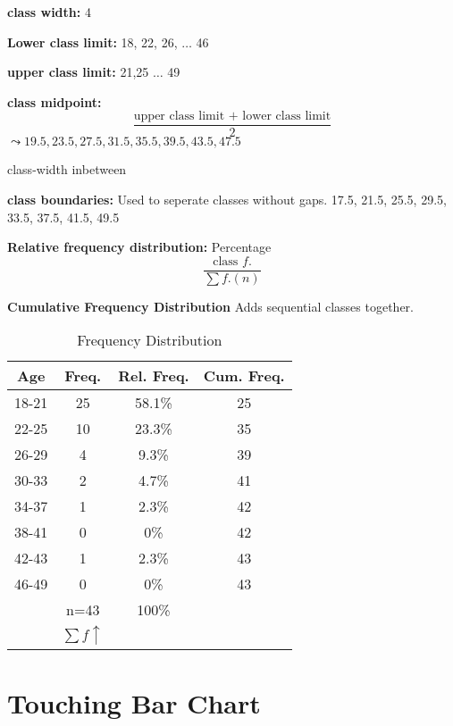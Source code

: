 \documentclass{book}
\begin{document}
\begin{multicols}{2}


    \textbf{class width:} 4

    \textbf{Lower class limit:} 18, 22, 26, $\ldots$ 46

    \textbf{upper class limit:} 21,25 $\ldots$ 49

    \textbf{class midpoint:}
    \[ \frac{\text{upper class limit + lower class limit}}{2}\] 
    $\leadsto 19.5, 23.5, 27.5, 31.5, 35.5, 39.5, 43.5, 47.5$

    class-width inbetween

    \textbf{class boundaries:}
    Used to seperate classes without gaps.
    17.5, 21.5, 25.5, 29.5, 33.5, 37.5, 41.5, 49.5

    \textbf{Relative frequency distribution:} Percentage \[\frac{\text{class } f.}{\sum f. (n)}\]

    \textbf{Cumulative Frequency Distribution}
    Adds sequential classes together.
\end{multicols}

\begin{table}[htbp]
    \centering
    \begin{tabular}{c|c|c|c}
        \toprule
        Age & Freq. & Rel. Freq. & Cum. Freq.\\
        \midrule
        18-21 & 25 & 58.1\% & 25  \\
        22-25 & 10 & 23.3\% & 35  \\
        26-29 & 4  & 9.3\%  & 39  \\
        30-33 & 2  & 4.7\%  & 41  \\
        34-37 & 1  & 2.3\%  & 42  \\
        38-41 & 0  & 0\%    & 42  \\
        42-43 & 1  & 2.3\%  & 43  \\
        46-49 & 0  & 0\%    & 43  \\
        \midrule
              & n=43 & 100\% \\
              & $\sum f \uparrow $ \\
              \bottomrule
    \end{tabular}
    \caption{Frequency Distribution}
\end{table}



\section{Touching Bar Chart}
\end{document}
